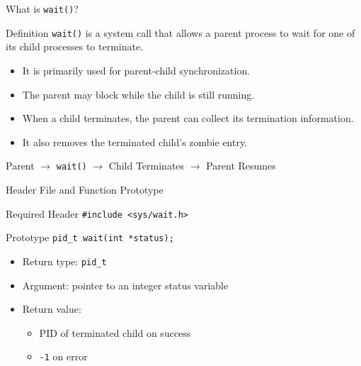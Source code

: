 \documentclass[aspectratio=169]{beamer}
\begin{document}
\begin{frame}{What is \texttt{wait()}?}

\begin{block}{Definition}
\texttt{wait()} is a system call that allows a parent process to wait for
one of its child processes to terminate.
\end{block}

\begin{itemize}

    \item It is primarily used for parent-child synchronization.

    \item The parent may block while the child is still running.

    \item When a child terminates, the parent can collect its termination
    information.

    \item It also removes the terminated child's zombie entry.

\end{itemize}

\begin{center}
\Large
Parent $\longrightarrow$ \texttt{wait()} $\longrightarrow$
Child Terminates $\longrightarrow$ Parent Resumes
\end{center}

\end{frame}

\begin{frame}{Header File and Function Prototype}

\begin{block}{Required Header}
\centering
\texttt{\#include <sys/wait.h>}
\end{block}

\begin{block}{Prototype}
\centering
\texttt{pid\_t wait(int *status);}
\end{block}

\begin{itemize}

    \item Return type: \texttt{pid\_t}

    \item Argument: pointer to an integer status variable

    \item Return value:
    \begin{itemize}
        \item PID of terminated child on success
        \item \texttt{-1} on error
    \end{itemize}

\end{itemize}

\end{frame}
\end{document}
